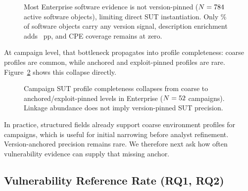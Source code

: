 \documentclass[sigconf]{acmart}
\begin{document}
\begin{figure}[!tb]
\centering
\resizebox{\columnwidth}{!}{}
\caption{Most Enterprise software evidence is not version-pinned ($N=784{}$ active software objects), limiting direct SUT instantiation. Only \softwarewithversionsignalpercentage\% of software objects carry any version signal, description enrichment adds \softwareversionenrichmentgainpp~pp, and CPE coverage remains at zero.}\label{fig:software_specificity}
\end{figure}

At campaign level, that bottleneck propagates into profile completeness: coarse profiles are common, while anchored and exploit-pinned profiles are rare. Figure~\ref{fig:tier_collapse} shows this collapse directly.

\begin{figure}[!tb]
\centering
\resizebox{\columnwidth}{!}{}
\caption{\label{fig:tier_collapse}Campaign SUT profile completeness collapses from coarse to anchored/exploit-pinned levels in Enterprise ($N=52{}$ campaigns). Linkage abundance does not imply version-pinned SUT precision.}
\end{figure}

In practice, structured fields already support coarse environment profiles for \campaignsuttiercoarsecount{} campaigns, which is useful for initial narrowing before analyst refinement. Version-anchored precision remains rare. We therefore next ask how often vulnerability evidence can supply that missing anchor.

\subsection{Vulnerability Reference Rate (RQ1, RQ2)}
\end{document}
